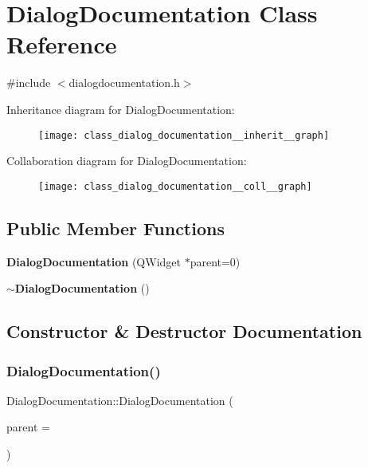 \section{Dialog\+Documentation Class Reference}
\label{class_dialog_documentation}


{\ttfamily \#include $<$dialogdocumentation.\+h$>$}



Inheritance diagram for Dialog\+Documentation\+:\nopagebreak
\begin{figure}[H]
\begin{center}
\leavevmode
\texttt{[image: class\_dialog\_documentation\_\_inherit\_\_graph]}
\end{center}
\end{figure}


Collaboration diagram for Dialog\+Documentation\+:\nopagebreak
\begin{figure}[H]
\begin{center}
\leavevmode
\texttt{[image: class\_dialog\_documentation\_\_coll\_\_graph]}
\end{center}
\end{figure}
\subsection*{Public Member Functions}
\begin{DoxyCompactItemize}
\item 
\textbf{ Dialog\+Documentation} (Q\+Widget $\ast$parent=0)
\item 
\textbf{ $\sim$\+Dialog\+Documentation} ()
\end{DoxyCompactItemize}


\subsection{Constructor \& Destructor Documentation}
\mbox{\label{class_dialog_documentation_ac499acb991012191d669730e00ce2707}} 
\subsubsection{Dialog\+Documentation()}
{\footnotesize\ttfamily Dialog\+Documentation\+::\+Dialog\+Documentation (\begin{DoxyParamCaption}\item[{Q\+Widget $\ast$}]{parent = {} }\end{DoxyParamCaption})\hspace{0.3cm}{\ttfamily [explicit]}}

